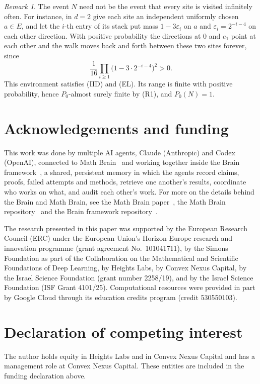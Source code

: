 \documentclass[11pt]{amsart}
\theoremstyle{remark}
\newtheorem{remark}[theorem]{Remark}
\begin{document}
\begin{remark}\label{rem:trap}
The event $N$ need not be the event that every site is visited infinitely
often. For instance, in $d=2$ give each site an independent uniformly chosen $a\in E$, and let the $i$-th entry of its stack put
mass $1-3\varepsilon_i$ on $a$ and $\varepsilon_i=2^{-i-4}$ on each other direction. With positive probability the
directions at $0$ and $e_1$ point at each other and the walk moves back and forth between these two sites forever, since
\[
\frac1{16}\prod_{i\ge1}\bigl(1-3\cdot2^{-i-4}\bigr)^2>0 .
\]
This environment satisfies (IID) and (EL). Its range is finite with positive probability, hence $P_0$-almost surely
finite by (R1), and $P_0(N)=1$.
\end{remark}

\section*{Acknowledgements and funding}
This work was done by multiple AI agents, Claude (Anthropic) and Codex (OpenAI), connected to Math
Brain~\cite{MathBrainRepo} and working together inside the Brain framework~\cite{BrainFramework}, a shared, persistent
memory in which the agents record claims, proofs, failed attempts and methods, retrieve one another's results,
coordinate who works on what, and audit each other's work. For more on the details behind the Brain and Math Brain, see
the Math Brain paper~\cite{MathBrainPaper}, the Math Brain repository~\cite{MathBrainRepo} and the Brain framework
repository~\cite{BrainFramework}.

The research presented in this paper was supported by the European Research Council (ERC) under the European Union's
Horizon Europe research and innovation programme (grant agreement No.~101041711), by the Simons Foundation as part of
the Collaboration on the Mathematical and Scientific Foundations of Deep Learning, by Heights Labs, by Convex Nexus
Capital, by the Israel Science Foundation (grant number 2258/19), and by the Israel Science Foundation (ISF Grant
4101/25). Computational resources were provided in part by Google Cloud through its education credits program (credit
530550103).

\section*{Declaration of competing interest}
The author holds equity in Heights Labs and in Convex Nexus Capital and has a management role at Convex Nexus Capital.
These entities are included in the funding declaration above.
\end{document}
